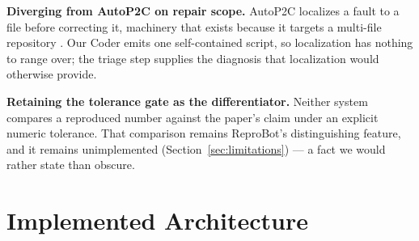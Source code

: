 \documentclass[11pt]{article}
\begin{document}
\textbf{Diverging from AutoP2C on repair scope.} AutoP2C localizes a fault to a file
before correcting it, machinery that exists because it targets a multi-file repository
\cite{lin2025autop2c}. Our Coder emits one self-contained script, so localization has
nothing to range over; the triage step supplies the diagnosis that localization would
otherwise provide.

\textbf{Retaining the tolerance gate as the differentiator.} Neither system compares a
reproduced number against the paper's claim under an explicit numeric tolerance. That
comparison remains ReproBot's distinguishing feature, and it remains unimplemented
(Section~\ref{sec:limitations}) --- a fact we would rather state than obscure.

\section{Implemented Architecture}
\label{sec:architecture}
\end{document}
